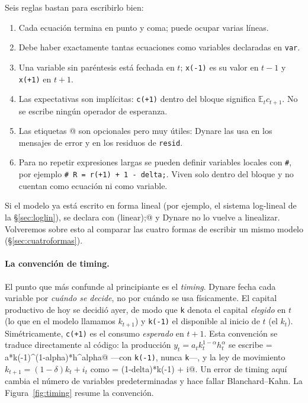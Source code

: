 \documentclass[11pt,a4paper]{report}
\newcommand{\code}[1]{\texttt{#1}}
\newcommand{\E}{\mathbb{E}}
\begin{document}
\noindent Seis reglas bastan para escribirlo bien:
\begin{enumerate}[label=(\roman*), leftmargin=2em, itemsep=2pt, topsep=2pt]
\item Cada ecuación termina en punto y coma; puede ocupar varias líneas.
\item Debe haber exactamente tantas ecuaciones como variables declaradas en \code{var}.
\item Una variable sin paréntesis está fechada en $t$; \code{x(-1)} es su valor en
  $t-1$ y \code{x(+1)} en $t+1$.
\item Las expectativas son implícitas: \code{c(+1)} dentro del bloque significa
  $\E_t c_{t+1}$. No se escribe ningún operador de esperanza.
\item Las etiquetas \lstinline@[name='...']@ son opcionales pero muy útiles: Dynare las
  usa en los mensajes de error y en los residuos de \code{resid}.
\item Para no repetir expresiones largas se pueden definir variables locales con
  \code{\#}, por ejemplo \lstinline|# R = r(+1) + 1 - delta;|. Viven solo dentro del
  bloque y no cuentan como ecuación ni como variable.
\end{enumerate}
Si el modelo ya está escrito en forma lineal (por ejemplo, el sistema log-lineal de la
\S\ref{sec:loglin}), se declara con \lstinline@model(linear);@ y Dynare no lo vuelve a
linealizar. Volveremos sobre esto al comparar las cuatro formas de escribir un mismo
modelo (\S\ref{sec:cuatroformas}).

\paragraph{La convención de timing.} El punto que más confunde al principiante
es el \emph{timing}. Dynare fecha cada variable por \emph{cuándo se decide}, no
por cuándo se usa físicamente. El capital productivo de hoy se decidió ayer, de
modo que \code{k} denota el capital \emph{elegido} en $t$ (lo que en el modelo
llamamos $k_{t+1}$) y \code{k(-1)} el disponible al inicio de $t$ (el $k_t$).
Simétricamente, \code{c(+1)} es el consumo \emph{esperado} en $t+1$. Esta
convención se traduce directamente al código: la producción
$y_t=a_t k_t^{1-\alpha}h_t^{\alpha}$ se escribe
\lstinline@y = a*k(-1)^(1-alpha)*h^alpha@ ---con \code{k(-1)}, nunca \code{k}---,
y la ley de movimiento $k_{t+1}=(1-\delta)k_t+i_t$ como
\lstinline@k = (1-delta)*k(-1) + i@. Un error de timing aquí cambia el número de
variables predeterminadas y hace fallar Blanchard--Kahn. La
Figura~\ref{fig:timing} resume la convención.
\end{document}
